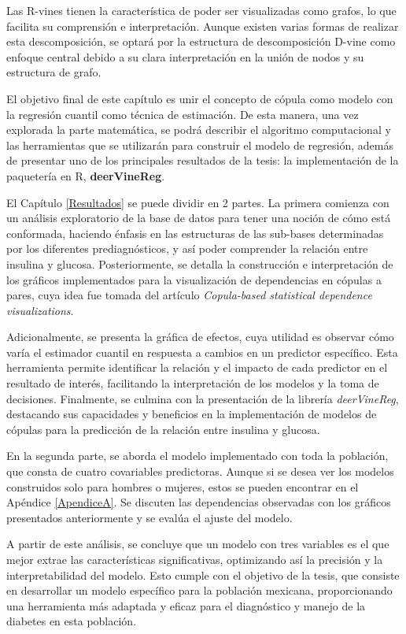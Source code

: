 Las R-vines tienen la característica de poder ser visualizadas como grafos, lo que facilita su comprensión e interpretación. Aunque existen varias formas de realizar esta descomposición, se optará por la estructura de descomposición D-vine como enfoque central debido a su clara interpretación en la unión de nodos y su estructura de grafo.

El objetivo final de este capítulo es unir el concepto de cópula como modelo con la regresión cuantil como técnica de estimación. De esta manera, una vez explorada la parte matemática, se podrá describir el algoritmo computacional y las herramientas que se utilizarán para construir el modelo de regresión, además de presentar uno de los principales resultados de la tesis: la implementación de la paquetería en R, \textbf{deerVineReg}.


El Capítulo \ref{Resultados} se puede dividir en 2 partes. La primera comienza con un análisis exploratorio de la base de datos para tener una noción de cómo está conformada, haciendo énfasis en las estructuras de las sub-bases determinadas por los diferentes prediagnósticos, y así poder comprender la relación entre insulina y glucosa. Posteriormente, se detalla la construcción e interpretación de los gráficos implementados para la visualización de dependencias en cópulas a pares, cuya idea fue tomada del artículo \textit{Copula-based statistical dependence visualizations}. 

Adicionalmente, se presenta la gráfica de efectos, cuya utilidad es observar cómo varía el estimador cuantil en respuesta a cambios en un predictor específico. Esta herramienta permite identificar la relación y el impacto de cada predictor en el resultado de interés, facilitando la interpretación de los modelos y la toma de decisiones. Finalmente, se culmina con la presentación de la librería \textit{deerVineReg}, destacando sus capacidades y beneficios en la implementación de modelos de cópulas para la predicción de la relación entre insulina y glucosa.

En la segunda parte, se aborda el modelo implementado con toda la población, que consta de cuatro covariables predictoras. Aunque si se desea ver los modelos construidos solo para hombres o mujeres, estos se pueden encontrar en el Apéndice \ref{ApendiceA}. Se discuten las dependencias observadas con los gráficos presentados anteriormente y se evalúa el ajuste del modelo.

A partir de este análisis, se concluye que un modelo con tres variables es el que mejor extrae las características significativas, optimizando así la precisión y la interpretabilidad del modelo. Esto cumple con el objetivo de la tesis, que consiste en desarrollar un modelo específico para la población mexicana, proporcionando una herramienta más adaptada y eficaz para el diagnóstico y manejo de la diabetes en esta población.










